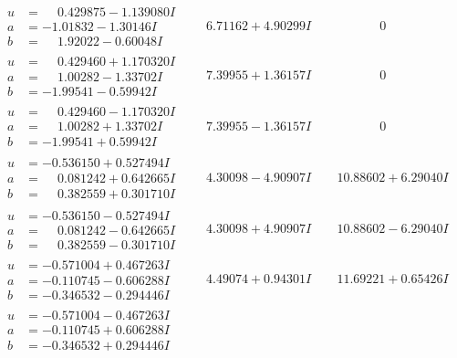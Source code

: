 \documentclass[1p]{elsarticle_modified}
\theoremstyle{definition}
\begin{document}
$$\begin{array}{c|c|c}
\begin{aligned}
u &= \phantom{-}0.429875 - 1.139080 I \\
a &= -1.01832 - 1.30146 I \\
b &= \phantom{-}1.92022 - 0.60048 I\end{aligned}
 & \phantom{-}6.71162 + 4.90299 I & \phantom{-0.000000 } 0 \\ \hline\begin{aligned}
u &= \phantom{-}0.429460 + 1.170320 I \\
a &= \phantom{-}1.00282 - 1.33702 I \\
b &= -1.99541 - 0.59942 I\end{aligned}
 & \phantom{-}7.39955 + 1.36157 I & \phantom{-0.000000 } 0 \\ \hline\begin{aligned}
u &= \phantom{-}0.429460 - 1.170320 I \\
a &= \phantom{-}1.00282 + 1.33702 I \\
b &= -1.99541 + 0.59942 I\end{aligned}
 & \phantom{-}7.39955 - 1.36157 I & \phantom{-0.000000 } 0 \\ \hline\begin{aligned}
u &= -0.536150 + 0.527494 I \\
a &= \phantom{-}0.081242 + 0.642665 I \\
b &= \phantom{-}0.382559 + 0.301710 I\end{aligned}
 & \phantom{-}4.30098 - 4.90907 I & \phantom{-}10.88602 + 6.29040 I \\ \hline\begin{aligned}
u &= -0.536150 - 0.527494 I \\
a &= \phantom{-}0.081242 - 0.642665 I \\
b &= \phantom{-}0.382559 - 0.301710 I\end{aligned}
 & \phantom{-}4.30098 + 4.90907 I & \phantom{-}10.88602 - 6.29040 I \\ \hline\begin{aligned}
u &= -0.571004 + 0.467263 I \\
a &= -0.110745 - 0.606288 I \\
b &= -0.346532 - 0.294446 I\end{aligned}
 & \phantom{-}4.49074 + 0.94301 I & \phantom{-}11.69221 + 0.65426 I \\ \hline\begin{aligned}
u &= -0.571004 - 0.467263 I \\
a &= -0.110745 + 0.606288 I \\
b &= -0.346532 + 0.294446 I\end{aligned}

\end{array}$$
\end{document}
